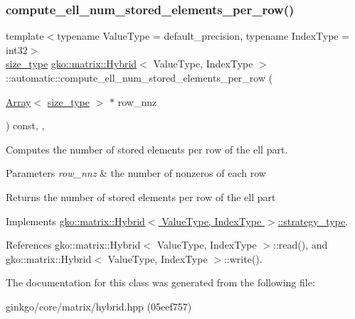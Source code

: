 \subsubsection{\texorpdfstring{compute\+\_\+ell\+\_\+num\+\_\+stored\+\_\+elements\+\_\+per\+\_\+row()}{compute\_ell\_num\_stored\_elements\_per\_row()}}
{\footnotesize\ttfamily template$<$typename Value\+Type = default\+\_\+precision, typename Index\+Type = int32$>$ \\
\hyperlink{namespacegko_a6e5c95df0ae4e47aab2f604a22d98ee7}{size\+\_\+type} \hyperlink{classgko_1_1matrix_1_1Hybrid}{gko\+::matrix\+::\+Hybrid}$<$ Value\+Type, Index\+Type $>$\+::automatic\+::compute\+\_\+ell\+\_\+num\+\_\+stored\+\_\+elements\+\_\+per\+\_\+row (\begin{DoxyParamCaption}\item[{\hyperlink{classgko_1_1Array}{Array}$<$ \hyperlink{namespacegko_a6e5c95df0ae4e47aab2f604a22d98ee7}{size\+\_\+type} $>$ $\ast$}]{row\+\_\+nnz }\end{DoxyParamCaption}) const\hspace{0.3cm}{\ttfamily [inline]}, {\ttfamily [override]}, {\ttfamily [virtual]}}



Computes the number of stored elements per row of the ell part. 


\begin{DoxyParams}{Parameters}
{\em row\+\_\+nnz} & the number of nonzeros of each row\\
\hline
\end{DoxyParams}
\begin{DoxyReturn}{Returns}
the number of stored elements per row of the ell part 
\end{DoxyReturn}


Implements \hyperlink{classgko_1_1matrix_1_1Hybrid_1_1strategy__type_a0a0cd4024f27c7d0f286f35fc0a6de60}{gko\+::matrix\+::\+Hybrid$<$ Value\+Type, Index\+Type $>$\+::strategy\+\_\+type}.



References gko\+::matrix\+::\+Hybrid$<$ Value\+Type, Index\+Type $>$\+::read(), and gko\+::matrix\+::\+Hybrid$<$ Value\+Type, Index\+Type $>$\+::write().



The documentation for this class was generated from the following file\+:\begin{DoxyCompactItemize}
\item 
ginkgo/core/matrix/hybrid.\+hpp (05eef757)\end{DoxyCompactItemize}
